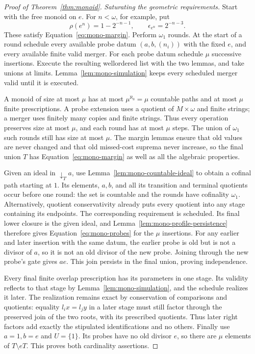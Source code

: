 \begin{proof}[Proof of Theorem~\ref{thm:monoid}]
\smallskip\noindent\textit{Saturating the geometric requirements.}
Start with the free monoid on $e$.  For $n<\omega$, for example, put
\[
 \rho(e^n)=1-2^{-n-1},\qquad \epsilon_{e^n}=2^{-n-3}.
\]
These satisfy Equation~\eqref{eq:mono-margin}.  Perform $\omega_1$
rounds.  At the start of a round schedule every available probe datum
$(a,b,(n_i))$ with the fixed $e$, and every available finite valid
merger.  For each probe datum schedule $\mu$ successive insertions.
Execute the resulting wellordered list with the two lemmas, and take
unions at limits.  Lemma~\ref{lem:mono-simulation} keeps every
scheduled merger valid until it is executed.

A monoid of size at most $\mu$ has at most $\mu^{\aleph_0}=\mu$
countable paths and at most $\mu$ finite prescriptions.  A probe
extension uses a quotient of $M\times\omega$ and finite strings;
a merger uses finitely many copies and finite strings.  Thus every
operation preserves size at most $\mu$, and each round has at most
$\mu$ steps.  The union of $\omega_1$ such rounds still has size
at most $\mu$.  The margin lemmas ensure that old values are never
changed and that old missed-cost suprema never increase, so the final
union $T$ has Equation~\eqref{eq:mono-margin} as well as all the
algebraic properties.

Given an ideal in $\downarrow_T a$, use
Lemma~\ref{lem:mono-countable-ideal} to obtain a cofinal path starting
at $1$.  Its elements, $a,b$, and all its transition and terminal
quotients occur before one round: the set is countable and the rounds
have cofinality $\omega_1$.  Alternatively, quotient conservativity
already puts every quotient into any stage containing its endpoints.
The corresponding requirement is scheduled.  Its final lower closure
is the given ideal, and Lemma~\ref{lem:mono-profile-persistence}
therefore gives Equation~\eqref{eq:mono-probes} for the $\mu$
insertions.  For any earlier and later insertion with the same datum, the
earlier probe is old but is not a divisor of $a$, so it is not an old
divisor of the new probe.  Joining through the new probe's gate gives
$ae$.  This join persists in the final union, proving independence.

Every final finite overlap prescription has its parameters in one
stage.  Its validity reflects to that stage by
Lemma~\ref{lem:mono-simulation}, and the schedule realizes it later.
The realization remains exact by conservation of comparisons and
quotients: equality $l_i x=l_j y$ in a later stage must still factor
through the preserved join of the two roots, with its prescribed
quotients.  Thus later right factors add exactly the stipulated
identifications and no others.  Finally use $a=1,b=e$ and $U=\{1\}$.
Its probes have no old divisor $e$, so there are $\mu$ elements of
$T\setminus eT$.  This proves both cardinality assertions.


\end{proof}
